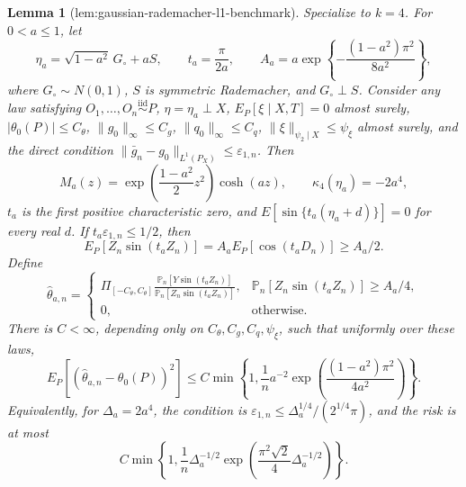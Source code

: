 \documentclass{article}
\newtheorem{lemma}{Lemma}
\begin{document}
\begin{lemma}[lem:gaussian-rademacher-l1-benchmark]\label{lem:gaussian-rademacher-l1-benchmark}
Specialize to \(k=4\).  For \(0<a\le1\), let
\[
 \eta_a=\sqrt{1-a^2}\,G_{\circ}+aS,
 \qquad
 t_a=\frac{\pi}{2a},
 \qquad
 A_a=a\exp\!\left\{-\frac{(1-a^2)\pi^2}{8a^2}\right\},
\]
where \(G_{\circ}\sim N(0,1)\), \(S\) is symmetric Rademacher, and \(G_{\circ}\perp S\).  Consider any law satisfying \(O_1,\ldots,O_n\stackrel{\mathrm{iid}}{\sim}P\), \(\eta=\eta_a\perp X\), \(E_P[\xi\mid X,T]=0\) almost surely, \(\lvert\theta_0(P)\rvert\le C_{\theta}\), \(\lVert g_0\rVert_{\infty}\le C_g\), \(\lVert q_0\rVert_{\infty}\le C_q\), \(\lVert\xi\rVert_{\psi_2\mid X}\le\psi_{\xi}\) almost surely, and the direct condition \(\lVert\bar g_n-g_0\rVert_{L^1(P_X)}\le\varepsilon_{1,n}\).  Then
\[
 M_a(z)=\exp\!\left(\frac{1-a^2}{2}z^2\right)\cosh(az),
 \qquad
 \kappa_4(\eta_a)=-2a^4,
\]
\(t_a\) is the first positive characteristic zero, and \(E[\sin\{t_a(\eta_a+d)\}]=0\) for every real \(d\).  If \(t_a\varepsilon_{1,n}\le1/2\), then
\[
 E_P[Z_n\sin(t_aZ_n)]
 =A_aE_P[\cos(t_aD_n)]
 \ge A_a/2.
\]
Define
\[
 \widehat\theta_{a,n}
 =
 \begin{cases}
 \displaystyle
 \Pi_{[-C_{\theta},C_{\theta}]}
 \frac{\mathbb P_n[Y\sin(t_aZ_n)]}
      {\mathbb P_n[Z_n\sin(t_aZ_n)]},
 &\displaystyle \mathbb P_n[Z_n\sin(t_aZ_n)]\ge A_a/4,\\[3mm]
 0,&\text{otherwise}.
 \end{cases}
\]
There is \(C<\infty\), depending only on \(C_{\theta},C_g,C_q,\psi_{\xi}\), such that uniformly over these laws,
\[
 E_P[(\widehat\theta_{a,n}-\theta_0(P))^2]
 \le C\min\!\left\{1,\frac1n a^{-2}
 \exp\!\left(\frac{(1-a^2)\pi^2}{4a^2}\right)\right\}.
\]
Equivalently, for \(\Delta_a=2a^4\), the condition is \(\varepsilon_{1,n}\le\Delta_a^{1/4}/(2^{1/4}\pi)\), and the risk is at most
\[
 C\min\!\left\{1,\frac1n\Delta_a^{-1/2}
 \exp\!\left(\frac{\pi^2\sqrt2}{4}\Delta_a^{-1/2}\right)\right\}.
\]
\end{lemma}
\end{document}
